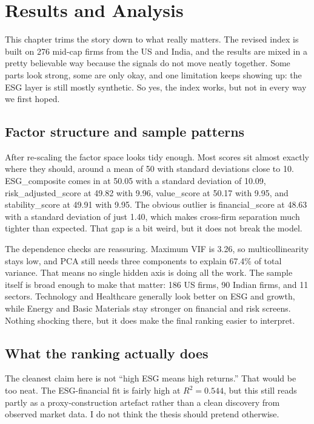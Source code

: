 \chapter{Results and Analysis}
\label{ch:results}

This chapter trims the story down to what really matters.
The revised index is built on 276 mid-cap firms from the US and India, and the results are mixed in a pretty believable way because the signals do not move neatly together.
Some parts look strong, some are only okay, and one limitation keeps showing up: the ESG layer is still mostly synthetic.
So yes, the index works, but not in every way we first hoped.

\section{Factor structure and sample patterns}
\label{sec:descriptive}
\label{sec:correlations}
\label{sec:sector_geo}

After re-scaling the factor space looks tidy enough.
Most scores sit almost exactly where they should, around a mean of 50 with standard deviations close to 10.
ESG\_composite comes in at 50.05 with a standard deviation of 10.09, risk\_adjusted\_score at 49.82 with 9.96, value\_score at 50.17 with 9.95, and stability\_score at 49.91 with 9.95.
The obvious outlier is financial\_score at 48.63 with a standard deviation of just 1.40, which makes cross-firm separation much tighter than expected.
That gap is a bit weird, but it does not break the model.

The dependence checks are reassuring.
Maximum VIF is 3.26, so multicollinearity stays low, and PCA still needs three components to explain 67.4\% of total variance.
That means no single hidden axis is doing all the work.
The sample itself is broad enough to make that matter: 186 US firms, 90 Indian firms, and 11 sectors.
Technology and Healthcare generally look better on ESG and growth, while Energy and Basic Materials stay stronger on financial and risk screens.
Nothing shocking there, but it does make the final ranking easier to interpret.

\section{What the ranking actually does}
\label{sec:esg_financial}
\label{sec:factor_validity}
\label{sec:monotonicity}
\label{sec:rankings}
\label{sec:profiles}

The cleanest claim here is not ``high ESG means high returns.''
That would be too neat.
The ESG-financial fit is fairly high at $R^2 = 0.544$, but this still reads partly as a proxy-construction artefact rather than a clean discovery from observed market data.
I do not think the thesis should pretend otherwise.

